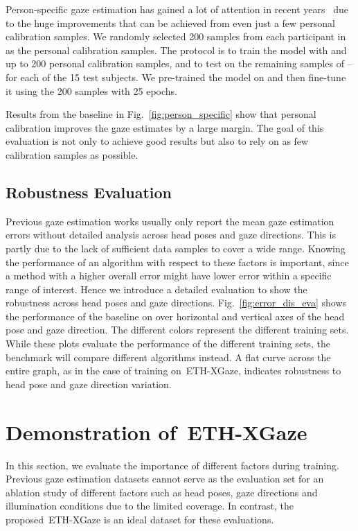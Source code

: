 \documentclass[runningheads]{llncs}
\newcommand{\datasetname}{ETH-XGaze\xspace}
\begin{document}
Person-specific gaze estimation has gained a lot of attention in recent years~\cite{Park2019ICCV,yu2019improving,liu2018differential} due to the huge improvements that can be achieved from even just a few personal calibration samples.
We randomly selected 200 samples from each participant in  as the personal calibration samples.
The protocol is to train the model with  and up to 200 personal calibration samples, and to test on the remaining samples of  -- for each of the 15 test subjects. We pre-trained the model on  and then fine-tune it using the 200 samples with 25 epochs.

Results from the baseline in Fig.~\ref{fig:person_specific} show that personal calibration improves the gaze estimates by a large margin.
The goal of this evaluation is not only to achieve good results but also to rely on as few calibration samples as possible.

\subsection{Robustness Evaluation}
Previous gaze estimation works usually only report the mean gaze estimation errors without detailed analysis across head poses and gaze directions. This is partly due to the lack of sufficient data samples to cover a wide range. Knowing the performance of an algorithm with respect to these factors is important, since a method with a higher overall error might have lower error within a specific range of interest. Hence we introduce a detailed evaluation to show the robustness across head poses and gaze directions. Fig.~\ref{fig:error_dis_eva} shows the performance of the baseline on  over horizontal and vertical axes of the head pose and gaze direction. The different colors represent the different training sets. While these plots evaluate the performance of the different training sets, the benchmark will compare different algorithms instead.
A flat curve across the entire graph, as in the case of training on~\datasetname, indicates robustness to head pose and gaze direction variation.

\section{Demonstration of~\datasetname}

In this section, we evaluate the importance of different factors during training.
Previous gaze estimation datasets cannot serve as the evaluation set for an ablation study of different factors such as head poses, gaze directions and illumination conditions due to the limited coverage.
In contrast, the proposed~\datasetname is an ideal dataset for these evaluations.
\end{document}
